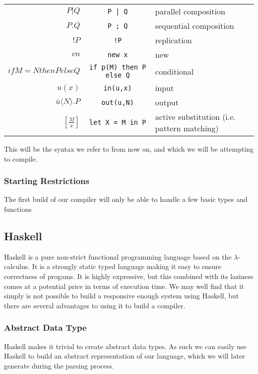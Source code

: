 \begin{table}[hc!]
    \begin{tabular}{r c l}
        $P|Q$& \verb!P | Q!& parallel composition\\
        $P.Q$& \verb!P ; Q!& sequential composition\\
        $!P$ & \verb?!P?& replication \\
        $vn$& \verb!new x!& new \\
        $if M=N then P else Q $&\verb!if p(M) then P else Q!& conditional \\
        $u(x)$&\verb!in(u,x)!& input \\
        $\bar{u}\langle N \rangle .P$&\verb!out(u,N)!& output \\
        $\left[ \frac{M}{x} \right]$&\verb!let X = M in P!&  active substitution (i.e. pattern matching) \\
    \end{tabular}
\end{table} 

This will be the syntax we refer to from now on, and which we will be attempting to compile.

\subsubsection{Starting Restrictions}

The first build of our compiler will only be able to handle a few basic types and functions

\subsection{Haskell}

Haskell is a pure non-strict functional programming language based on the $\lambda$-calculus. It is a strongly static typed language making it easy to ensure correctness of progams. It is highly expressive, but this combined with its laziness comes at a potential price in terms of execution time. We may well find that it simply is not possible to build a responsive enough system using Haskell, but there are several advantages to using it to build a compiler.

\subsubsection{Abstract Data Type}
Haskell makes it trivial to create abstract data types. As such we can easily use Haskell to build an abstract representation of our language, which we will later generate during the parsing process.
    
